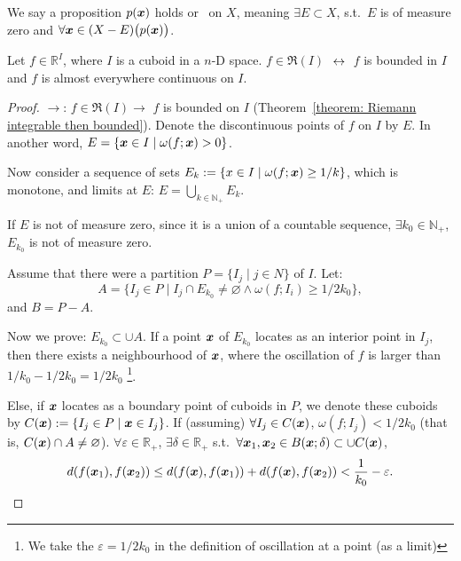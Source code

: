 \documentclass[openany]{book}
\begin{document}
We say a proposition $p(\boldsymbol{x})$ holds  or \ on $X$, meaning $\exists E \subset X$, s.t.\ $E$ is of measure zero and $\forall \boldsymbol{x} \in (X - E) \big(p (\boldsymbol{x})\big)$. 

\begin{theorem}
	\label{theorem: Lebesgue's criterion}
	Let $f \in \mathbb R^I$, where $I$ is a cuboid in a $n$-D space.
	$f \in \mathfrak R(I)$ $\;\leftrightarrow\;$ $f$ is bounded in $I$ and $f$ is almost everywhere continuous on $I$.
\end{theorem}
\begin{proof}
	$\to$: $f \in \mathfrak R(I) \to$ $f$ is bounded on $I$ (Theorem~\ref{theorem: Riemann integrable then bounded}).
	Denote the discontinuous points of $f$ on $I$ by $E$. In another word, $E = \{\boldsymbol{x} \in I \mid \omega(f; \boldsymbol{x}) > 0\}$.

	Now consider a sequence of sets $E_k := \{x \in I \mid \omega(f; \boldsymbol{x}) \geq 1/k\}$, which is monotone, and limits at $E$: $E = \bigcup_{k \in \mathbb N_+} E_k$.

	If $E$ is not of measure zero, since it is a union of a countable sequence, $\exists k_0 \in \mathbb N_+$, $E_{k_0}$ is not of measure zero.

	Assume that there were a partition $P = \{I_j \mid j \in N\}$ of $I$. Let:
	\begin{equation*}
		A = \{I_j \in P \mid I_j \cap E_{k_0} \neq \varnothing \wedge \omega(f; I_i) \geq 1/2k_0\},
	\end{equation*}
	and $B = P - A$.

	Now we prove: $E_{k_0} \subset \cup A$. 
	If a point $\boldsymbol{x}$ of $E_{k_0}$ locates as an interior point in $I_j$, then there exists a neighbourhood of $\boldsymbol{x}$, where the oscillation of $f$ is larger than $1/k_0 - 1/2k_0 = 1/2k_0$
		\footnote{We take the $\varepsilon = 1/2k_0$ in the definition of oscillation at a point (as a limit)}.
	
	Else, if $\boldsymbol{x}$ locates as a boundary point of cuboids in $P$, we denote these cuboids by $C(\boldsymbol{x}) := \{I_j \in P \mid \boldsymbol{x} \in I_j\}$. 
	If (assuming) $\forall I_j \in C(\boldsymbol{x})$, $\omega(f; I_j) < 1/2k_0$ (that is, $C(\boldsymbol{x}) \cap A \neq \varnothing$). $\forall \varepsilon \in \mathbb R_+$, $\exists \delta \in \mathbb R_+$ s.t.\ $\forall \boldsymbol{x}_1, \boldsymbol{x}_2 \in B(\boldsymbol{x}; \delta)\subset \cup C(\boldsymbol{x}) $, 
	\begin{equation*}
		d(f(\boldsymbol{x}_1), f(\boldsymbol{x}_2)) \leq d(f(\boldsymbol{x}), f(\boldsymbol{x}_1)) + d(f(\boldsymbol{x}), f(\boldsymbol{x}_2)) < \frac{1}{k_0} - \varepsilon.
	\end{equation*}


\end{proof}
\end{document}
